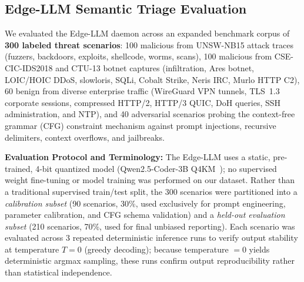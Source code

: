 \documentclass[journal]{IEEEtran}
\renewcommand{\_}{\textunderscore\allowbreak}
\begin{document}
\subsection{Edge-LLM Semantic Triage Evaluation}
We evaluated the Edge-LLM daemon across an expanded benchmark corpus of \textbf{300 labeled threat scenarios}:
100 malicious from UNSW-NB15 attack traces (fuzzers, backdoors, exploits, shellcode, worms, scans),
100 malicious from CSE-CIC-IDS2018 and CTU-13 botnet captures (infiltration, Ares botnet, LOIC/HOIC DDoS, slowloris, SQLi, Cobalt Strike, Neris IRC, Murlo HTTP C2),
60 benign from diverse enterprise traffic (WireGuard VPN tunnels, TLS~1.3 corporate sessions, compressed HTTP/2, HTTP/3 QUIC, DoH queries, SSH administration, and NTP), and
40 adversarial scenarios probing the context-free grammar (CFG) constraint mechanism against prompt injections, recursive delimiters, context overflows, and jailbreaks.

\textbf{Evaluation Protocol and Terminology:} The Edge-LLM uses a static, pre-trained,
4-bit quantized model (Qwen2.5-Coder-3B Q4\_K\_M~\cite{qwen2024qwen25coder}); no supervised
weight fine-tuning or model training was performed on our dataset. Rather than a traditional
supervised train/test split, the 300 scenarios were partitioned into a
\emph{calibration subset} (90 scenarios, 30\%, used exclusively for prompt
engineering, parameter calibration, and CFG schema validation) and a \emph{held-out evaluation subset}
(210 scenarios, 70\%, used for final unbiased reporting). Each scenario was evaluated across
3 repeated deterministic inference runs to verify output stability at temperature $T=0$
(greedy decoding); because temperature $=0$ yields deterministic argmax sampling, these
runs confirm output reproducibility rather than statistical independence.
\end{document}
